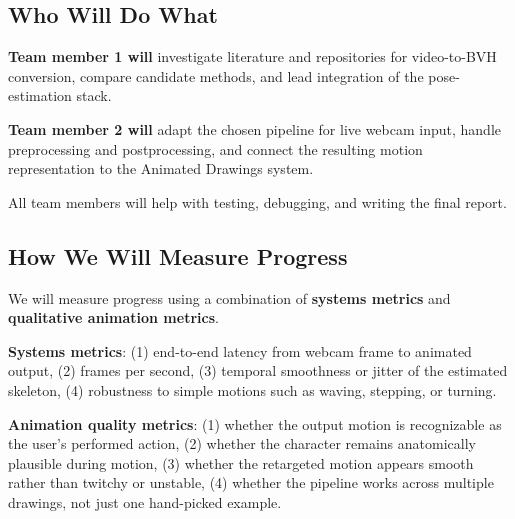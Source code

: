 \subsection*{Who Will Do What}

\textbf{Team member 1 will} investigate literature and repositories for video-to-BVH conversion, compare candidate methods, and lead integration of the pose-estimation stack.

\textbf{Team member 2 will} adapt the chosen pipeline for live webcam input, handle preprocessing and postprocessing, and connect the resulting motion representation to the Animated Drawings system.

All team members will help with testing, debugging, and writing the final report.

\subsection*{How We Will Measure Progress}

We will measure progress using a combination of \textbf{systems metrics} and \textbf{qualitative animation metrics}.


\textbf{Systems metrics}: (1) end-to-end latency from webcam frame to animated output, (2) frames per second, (3) temporal smoothness or jitter of the estimated skeleton, (4) robustness to simple motions such as waving, stepping, or turning.

\textbf{Animation quality metrics}: (1) whether the output motion is recognizable as the user's performed action, (2) whether the character remains anatomically plausible during motion, (3) whether the retargeted motion appears smooth rather than twitchy or unstable, (4) whether the pipeline works across multiple drawings, not just one hand-picked example.


